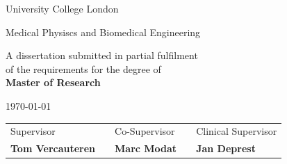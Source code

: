 \documentclass[a4paper,10pt]{book}
\theoremstyle{definition}
\begin{document}
\begin{titlepage}
\begin{center}
	\LARGE{\rm\expandafter{University College London}}\par
	\expandafter{\Large{Medical Physiscs and Biomedical Engineering}\par}
\end{center}

\vspace{1cm}

\begin{center}
	A dissertation submitted in partial fulfilment 
	\\
	of the requirements for the degree of
	\\ 
	{\bf Master of Research}	
\end{center}

\vspace{0.2cm}
\begin{center}
	\today
\end{center}

\vspace{2.0cm}

\begin{center}
\begin{tabular}{l p{1.5cm} l p{1.5cm} l}
	Supervisor&   & Co-Supervisor & &  Clinical Supervisor \\
	\textbf{Tom Vercauteren} &  & \textbf{Marc Modat}& & \textbf{Jan Deprest}  \\
\end{tabular}
\end{center}

\par
\vfill\par 

\endgroup


\end{titlepage}




 

\end{document}
